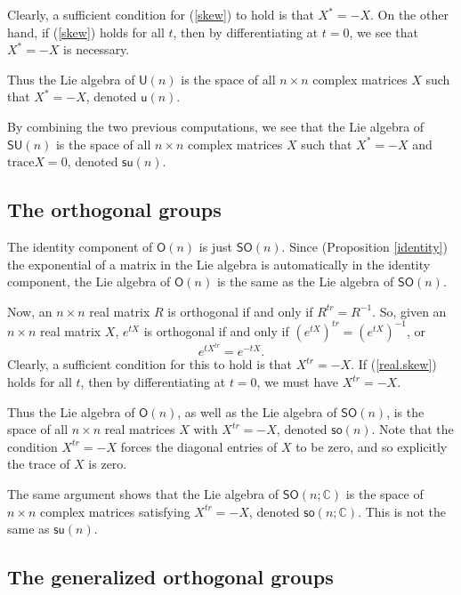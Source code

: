 \documentclass{amsbook}
\theoremstyle{plain}
\numberwithin{equation}{chapter}
\numberwithin{theorem}{chapter}
\begin{document}
Clearly, a sufficient condition for (\ref{skew}) to hold is that $X^{*}=-X$.
On the other hand, if (\ref{skew}) holds for all $t$, then by differentiating
at $t=0$, we see that $X^{*}=-X$ is necessary.

Thus the Lie algebra of $\mathsf{U}(n)$ is the space of all $n\times n$
complex matrices $X$ such that $X^{*}=-X$, denoted $\mathsf{u}(n)$.

By combining the two previous computations, we see that the Lie algebra of
$\mathsf{SU}(n)$ is the space of all $n\times n$ complex matrices $X$ such
that $X^{*}=-X$ and $\mathrm{trace}X=0$, denoted $\mathsf{su}(n)$.

\subsection{The orthogonal groups}

The identity component of $\mathsf{O}(n)$ is just $\mathsf{SO}(n)$. Since
(Proposition \ref{identity}) the exponential of a matrix in the Lie algebra is
automatically in the identity component, the Lie algebra of $\mathsf{O}(n) $
is the same as the Lie algebra of $\mathsf{SO}(n)$.

Now, an $n\times n$ real matrix $R$ is orthogonal if and only if
$R^{tr}=R^{-1}$. So, given an $n\times n$ real matrix $X$, $e^{tX}$ is
orthogonal if and only if $(e^{tX})^{tr}=(e^{tX})^{-1}$, or
\begin{equation}
e^{tX^{tr}}=e^{-tX}\text{.}\label{real.skew}%
\end{equation}
Clearly, a sufficient condition for this to hold is that $X^{tr}=-X$. If
(\ref{real.skew}) holds for all $t$, then by differentiating at $t=0$, we must
have $X^{tr}=-X$.

Thus the Lie algebra of $\mathsf{O}(n)$, as well as the Lie algebra of
$\mathsf{SO}(n)$, is the space of all $n\times n$ real matrices $X$ with
$X^{tr}=-X$, denoted $\mathsf{so}(n)$. Note that the condition $X^{tr}=-X$
forces the diagonal entries of $X$ to be zero, and so explicitly the trace of
$X$ is zero.

The same argument shows that the Lie algebra of $\mathsf{SO}(n;\mathbb{C})$ is
the space of $n\times n$ complex matrices satisfying $X^{tr}=-X$, denoted
$\mathsf{so}(n;\mathbb{C})$. This is not the same as $\mathsf{su}(n)$.

\subsection{The generalized orthogonal groups}
\end{document}
